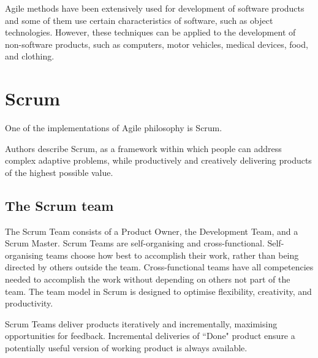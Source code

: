 Agile methods have been extensively used for development of software products and some of them use certain characteristics of software, such as object technologies. However, these techniques can be applied to the development of non-software products, such as computers, motor vehicles, medical devices, food, and clothing.



\section{Scrum}

One of the implementations of Agile philosophy is Scrum.

Authors describe Scrum, \cite{scrum-guide} as a framework within which people can address complex adaptive problems, while productively and creatively delivering products of the highest possible value.

\subsection{The Scrum team}

The Scrum Team consists of a Product Owner, the Development Team, and a Scrum Master. Scrum Teams are self-organising and cross-functional. Self-organising teams choose how best to accomplish their work, rather than being directed by others outside the team. Cross-functional teams have all competencies needed to accomplish the work without depending on others not part of the team. The team model in Scrum is designed to optimise flexibility, creativity, and productivity.

Scrum Teams deliver products iteratively and incrementally, maximising opportunities for feedback. Incremental deliveries of ``Done" product ensure a potentially useful version of 
working product is always available.

